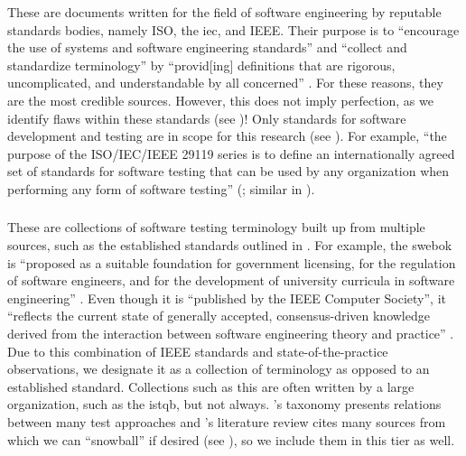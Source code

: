 These are documents written for the field of software engineering by reputable
standards bodies, namely ISO, the \acf{iec}, and IEEE. Their purpose is to
``encourage the use of systems and software engineering standards'' and
``collect and standardize terminology'' by ``provid[ing] definitions that are
rigorous, uncomplicated, and understandable by all concerned''
\citep[p.~viii]{IEEE2017}. For these reasons, they
are the most credible sources. However, this does not imply perfection, as we
identify  %
flaws within these standards (see )!
Only standards for software development and testing are in scope for
this research (see ). For example, ``the purpose of the
ISO/IEC/IEEE 29119 series is to define an internationally agreed set of
standards for software testing that can be used by any organization when
performing any form of software testing''
\ifnotpaper(\fi\citeyear[p.~vii]{IEEE2022}\ifnotpaper; similar in
\citeyear[p.~ix]{IEEE2016})\fi.

\subsubsection{}\label{metas}

These are collections of software testing terminology built up from multiple
sources, such as the established standards outlined in . For
example, the \acs{swebok} is ``proposed as a
suitable foundation for government licensing, for the regulation of software
engineers, and for the development of university curricula in software
engineering'' \citep[p.~xix]{KanerEtAl2011}. Even though it is ``published by
the IEEE Computer Society'', it ``reflects the current state of generally
accepted, consensus-driven knowledge derived from the interaction between
software engineering theory and practice'' \citep{AboutSWEBOK}. Due to this
combination of IEEE standards and state-of-the-practice observations, we
designate it as a collection of terminology as opposed to an established
standard. Collections such as this are often written by a large
organization, such as the \acf{istqb}, but not always. \ifnotpaper \else
    \citeauthor{Firesmith2015} \fi \citet{Firesmith2015}'s taxonomy presents
relations between many test approaches and \ifnotpaper \else
    \citeauthor{DoğanEtAl2014} \fi \citet{DoğanEtAl2014}'s literature
review cites many sources from which we can ``snowball'' if desired
(see ), so we include them in this tier as well.

